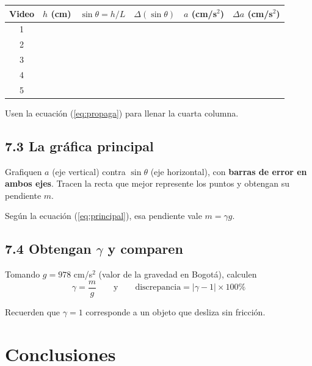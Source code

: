 \documentclass[11pt, letterpaper]{article}
\begin{document}
	\begin{center}
		\small
		\begin{tabular}{|c|c|c|c|c|c|}
			\hline
			Video & $h$ (cm) & $\sin\theta = h/L$ & $\Delta(\sin\theta)$
			& $a$ (cm/s$^2$) & $\Delta a$ (cm/s$^2$) \\
			\hline
			\rule{0pt}{3ex} 1 & & & & & \\ \hline
			\rule{0pt}{3ex} 2 & & & & & \\ \hline
			\rule{0pt}{3ex} 3 & & & & & \\ \hline
			\rule{0pt}{3ex} 4 & & & & & \\ \hline
			\rule{0pt}{3ex} 5 & & & & & \\ \hline
		\end{tabular}
	\end{center}
	
	\noindent
	Usen la ecuación (\ref{eq:propaga}) para llenar la cuarta columna.
	
	\subsection*{7.3 La gráfica principal}
	
	Grafiquen $a$ (eje vertical) contra $\sin\theta$ (eje horizontal), con
	\textbf{barras de error en ambos ejes}. Tracen la recta que mejor represente los
	puntos y obtengan su pendiente $m$.
	
	\vspace{0.15cm}
	\noindent
	Según la ecuación (\ref{eq:principal}), esa pendiente vale $m = \gamma g$.
	
	\subsection*{7.4 Obtengan $\gamma$ y comparen}
	
	Tomando $g = 978$ cm/s$^2$ (valor de la gravedad en Bogotá), calculen
	\begin{equation}
		\gamma = \frac{m}{g}
		\qquad\text{y}\qquad
		\text{discrepancia} = |\gamma - 1|\times 100\%
		\label{eq:gamma}
	\end{equation}
	
	\noindent
	Recuerden que $\gamma = 1$ corresponde a un objeto que desliza sin fricción.
	
	\section{Conclusiones}
	
\end{document}
